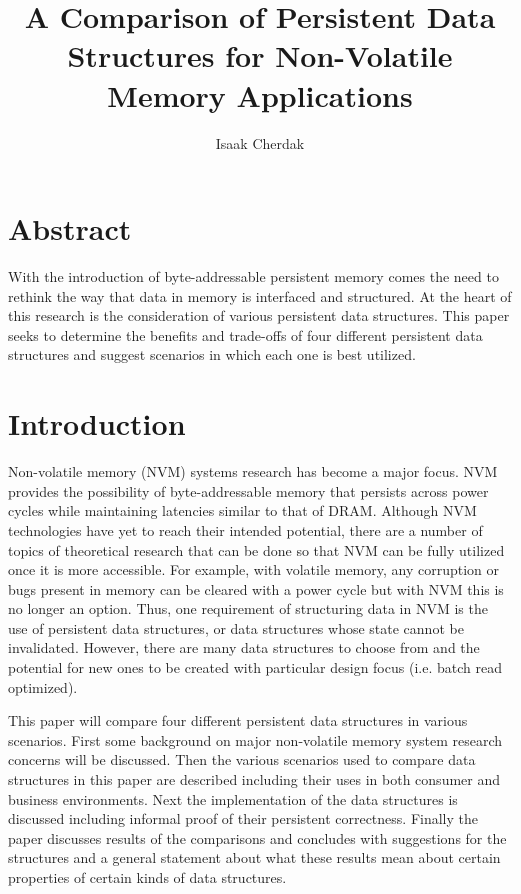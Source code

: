\documentclass[twocolumn]{article}
\title{A Comparison of Persistent Data Structures for Non-Volatile Memory
Applications}
\author{Isaak Cherdak}
\begin{document}
\maketitle

\section*{Abstract}

With the introduction of byte-addressable persistent memory comes the need to
rethink the way that data in memory is interfaced and structured. At the heart
of this research is the consideration of various persistent data structures.
This paper seeks to determine the benefits and trade-offs of four different
persistent data structures and suggest scenarios in which each one is best
utilized.

\pagebreak


\section{Introduction}

Non-volatile memory (NVM) systems research has become a major focus. NVM
provides the possibility of byte-addressable memory that persists across power
cycles while maintaining latencies similar to that of DRAM. Although NVM
technologies have yet to reach their intended potential, there are a number of
topics of theoretical research that can be done so that NVM can be fully
utilized once it is more accessible. For example, with volatile memory, any
corruption or bugs present in memory can be cleared with a power cycle but with
NVM this is no longer an option. Thus, one requirement of structuring data in
NVM is the use of persistent data structures, or data structures whose state
cannot be invalidated. However, there are many data structures to choose from
and the potential for new ones to be created with particular design focus (i.e.
batch read optimized).

This paper will compare four different persistent data structures in various
scenarios. First some background on major non-volatile memory system research
concerns will be discussed. Then the various scenarios used to compare data
structures in this paper are described including their uses in both consumer and
business environments. Next the implementation of the data structures is
discussed including informal proof of their persistent correctness. Finally the
paper discusses results of the comparisons and concludes with suggestions for
the structures and a general statement about what these results mean about
certain properties of certain kinds of data structures.
\end{document}
